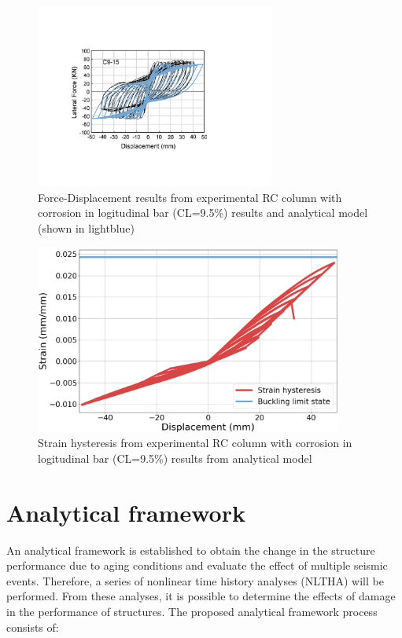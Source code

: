 \begin{figure}[htbp]
	\centering
	\includegraphics[width=0.7\textwidth]{Chapter-4/figs/Model_Calibration_Ma2012}
	\caption{Force-Displacement results from experimental RC column with corrosion in logitudinal bar (CL=9.5\%) results \cite{Ma2012} and analytical model (shown in lightblue)}
	\label{fig:ModelCalibration_Corrosion}
\end{figure}
\begin{figure}[htbp]
	\centering
	\includegraphics[width=0.9\textwidth]{Chapter-4/figs/MaEtAl_StrainHisteresis}
	\caption{Strain hysteresis from experimental RC column with corrosion in logitudinal bar (CL=9.5\%) results from analytical model}
	\label{fig:ModelCalibration_Corrosion_Hysteresis}
\end{figure}
\newpage

\section{Analytical framework}

An analytical framework is established to obtain the change in the structure performance due to aging conditions and evaluate the effect of multiple seismic events. Therefore, a series of nonlinear time history analyses (NLTHA) will be performed. From these analyses, it is possible to determine the effects of damage in the performance of structures. The proposed analytical framework process consists of:

